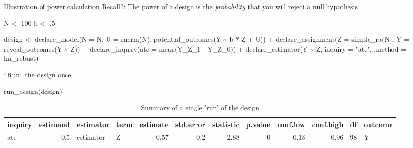 \documentclass[
  11pt,
  ignorenonframetext,
]{beamer}
\newenvironment{Shaded}{\begin{snugshade}}{\end{snugshade}}
\newcommand{\AttributeTok}[1]{\textcolor[rgb]{0.40,0.45,0.13}{#1}}
\newcommand{\DecValTok}[1]{\textcolor[rgb]{0.68,0.00,0.00}{#1}}
\newcommand{\FunctionTok}[1]{\textcolor[rgb]{0.28,0.35,0.67}{#1}}
\newcommand{\NormalTok}[1]{\textcolor[rgb]{0.00,0.23,0.31}{#1}}
\newcommand{\OtherTok}[1]{\textcolor[rgb]{0.00,0.23,0.31}{#1}}
\newcommand{\SpecialCharTok}[1]{\textcolor[rgb]{0.37,0.37,0.37}{#1}}
\newcommand{\StringTok}[1]{\textcolor[rgb]{0.13,0.47,0.30}{#1}}
\begin{document}
\begin{frame}[fragile]{Illustration of power calculation}
\protect\hypertarget{illustration-of-power-calculation}{}
Recall?: The power of a design is the \emph{probability} that you will
reject a null hypothesis

\begin{Shaded}
\begin{Highlighting}[]
\NormalTok{N }\OtherTok{\textless{}{-}} \DecValTok{100}
\NormalTok{b }\OtherTok{\textless{}{-}}\NormalTok{ .}\DecValTok{5}

\NormalTok{design }\OtherTok{\textless{}{-}} 
  \FunctionTok{declare\_model}\NormalTok{(}\AttributeTok{N =}\NormalTok{ N, }
    \AttributeTok{U =} \FunctionTok{rnorm}\NormalTok{(N),}
    \FunctionTok{potential\_outcomes}\NormalTok{(Y }\SpecialCharTok{\textasciitilde{}}\NormalTok{ b }\SpecialCharTok{*}\NormalTok{ Z }\SpecialCharTok{+}\NormalTok{ U)) }\SpecialCharTok{+} 
  \FunctionTok{declare\_assignment}\NormalTok{(}\AttributeTok{Z =} \FunctionTok{simple\_ra}\NormalTok{(N),}
                     \AttributeTok{Y =} \FunctionTok{reveal\_outcomes}\NormalTok{(Y }\SpecialCharTok{\textasciitilde{}}\NormalTok{ Z)) }\SpecialCharTok{+} 
  \FunctionTok{declare\_inquiry}\NormalTok{(}\AttributeTok{ate =} \FunctionTok{mean}\NormalTok{(Y\_Z\_1 }\SpecialCharTok{{-}}\NormalTok{ Y\_Z\_0)) }\SpecialCharTok{+} 
  \FunctionTok{declare\_estimator}\NormalTok{(Y }\SpecialCharTok{\textasciitilde{}}\NormalTok{ Z, }\AttributeTok{inquiry =} \StringTok{"ate"}\NormalTok{, }\AttributeTok{.method =}\NormalTok{ lm\_robust)}
\end{Highlighting}
\end{Shaded}
\end{frame}

\begin{frame}[fragile]{``Run'' the design once}
\protect\hypertarget{run-the-design-once}{}
\begin{Shaded}
\begin{Highlighting}[]
\FunctionTok{run\_design}\NormalTok{(design)}
\end{Highlighting}
\end{Shaded}

\begin{table}

\caption{Summary of a single 'run' of the design}
\centering
\begin{tabular}[t]{l|r|l|l|r|r|r|r|r|r|r|l}
\hline
inquiry & estimand & estimator & term & estimate & std.error & statistic & p.value & conf.low & conf.high & df & outcome\\
\hline
ate & 0.5 & estimator & Z & 0.57 & 0.2 & 2.88 & 0 & 0.18 & 0.96 & 98 & Y\\
\hline
\end{tabular}
\end{table}
\end{frame}
\end{document}
